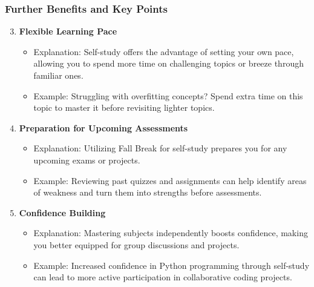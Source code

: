\documentclass[aspectratio=169]{beamer}
\begin{document}
\begin{frame}[fragile]
  \frametitle{Further Benefits and Key Points}
  \begin{enumerate}
    \setcounter{enumi}{2}
    \item \textbf{Flexible Learning Pace}
      \begin{itemize}
        \item Explanation: Self-study offers the advantage of setting your own pace, allowing you to spend more time on challenging topics or breeze through familiar ones.
        \item Example: Struggling with overfitting concepts? Spend extra time on this topic to master it before revisiting lighter topics.
      \end{itemize}
    
    \item \textbf{Preparation for Upcoming Assessments}
      \begin{itemize}
        \item Explanation: Utilizing Fall Break for self-study prepares you for any upcoming exams or projects.
        \item Example: Reviewing past quizzes and assignments can help identify areas of weakness and turn them into strengths before assessments.
      \end{itemize}
    
    \item \textbf{Confidence Building}
      \begin{itemize}
        \item Explanation: Mastering subjects independently boosts confidence, making you better equipped for group discussions and projects.
        \item Example: Increased confidence in Python programming through self-study can lead to more active participation in collaborative coding projects.
      \end{itemize}
  \end{enumerate}
\end{frame}
\end{document}
